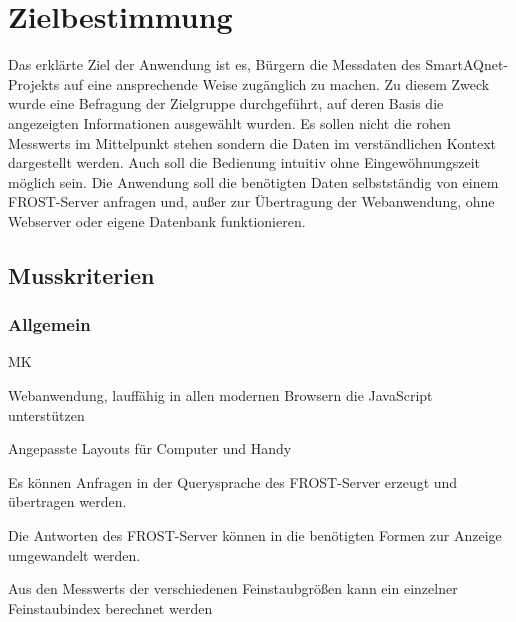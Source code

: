 \section{Zielbestimmung}
Das erklärte Ziel der Anwendung ist es, Bürgern die Messdaten des \gls{SmartAQnet}-Projekts auf eine ansprechende Weise zugänglich zu machen.
Zu diesem Zweck wurde eine Befragung der Zielgruppe durchgeführt, auf deren Basis die angezeigten Informationen ausgewählt wurden.
Es sollen nicht die rohen \glspl{Messwert} im Mittelpunkt stehen sondern die Daten im verständlichen Kontext dargestellt werden.
Auch soll die Bedienung intuitiv ohne Eingewöhnungszeit möglich sein.
Die Anwendung soll die benötigten Daten selbstständig von einem \gls{FROST-Server} anfragen und, außer zur Übertragung der \gls{Webanwendung}, ohne \gls{Webserver} oder eigene Datenbank funktionieren.

\subsection{Musskriterien}
\setcounter{counter}{10}

\subsubsection*{Allgemein}
\begin{Kriterien}{MK}
	\item \gls{Webanwendung}, lauffähig in allen modernen Browsern die JavaScript unterstützen

	\item Angepasste Layouts für Computer und \gls{Handy}
	
	\item Es können Anfragen in der \gls{Querysprache} des \gls{FROST-Server} erzeugt und übertragen werden.
	
	\item Die Antworten des \gls{FROST-Server} können in die benötigten Formen zur Anzeige umgewandelt werden.
	
	\item Aus den \glspl{Messwert} der verschiedenen Feinstaubgrößen kann ein einzelner \gls{Feinstaubindex} berechnet werden
\end{Kriterien}

